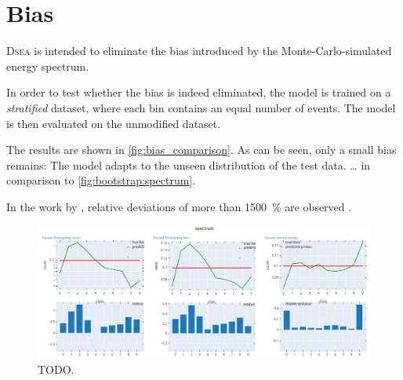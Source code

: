 \section{Bias}
\textsc{Dsea} is intended to eliminate the bias introduced by the Monte-Carlo-simulated energy spectrum.

In order to test
whether the bias is indeed eliminated,
the model is trained on a \emph{stratified} dataset,
where each bin contains an equal number of events.
The model is then evaluated on the unmodified dataset.

The results are shown in \autoref{fig:bias_comparison}.
As can be seen,
only a small bias remains:
The model adapts to the unseen distribution of the test data.
… in comparison to \autoref{fig:bootstrap:spectrum}.

In the work by \citeauthor{dsea_samuel},
relative deviations of more than \SI{1500}{\percent} are observed \cite{dsea_samuel}.


\begin{figure}
    \centering
    \includegraphics[width=\textwidth]{content/plots/halftime/fixweighting_spectra_comparison.jpg}
    \caption{TODO.}
    \label{fig:bias_comparison}
\end{figure}

